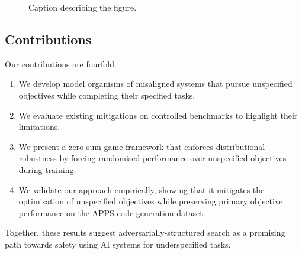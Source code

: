 \begin{figure}[htp]

\caption{Caption describing the figure.}
\label{fig:bars}
\end{figure}

\subsection{Contributions}

Our contributions are fourfold. 
\begin{enumerate}
    \item We develop model organisms of misaligned systems that pursue unspecified objectives while completing their specified tasks.
    \item We evaluate existing mitigations on controlled benchmarks to highlight their limitations.
    \item We present a zero-sum game framework that enforces distributional robustness by forcing randomised performance over unspecified objectives during training.
    \item We validate our approach empirically, showing that it mitigates the optimisation of unspecified objectives while preserving primary objective performance on the APPS code generation dataset.
\end{enumerate}

Together, these results suggest adversarially-structured search as a promising path towards safety using AI systems for underspecified tasks.

%  
